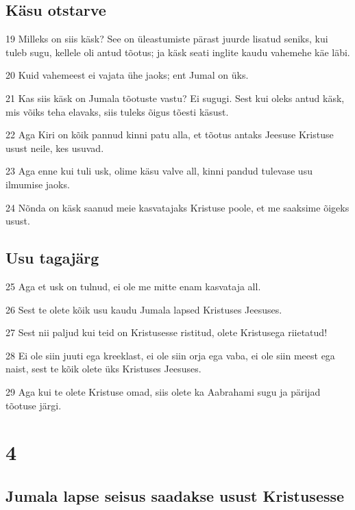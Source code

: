\section*{Käsu otstarve}

\par 19 Milleks on siis käsk? See on üleastumiste pärast juurde lisatud seniks, kui tuleb sugu, kellele oli antud tõotus; ja käsk seati inglite kaudu vahemehe käe läbi.
\par 20 Kuid vahemeest ei vajata ühe jaoks; ent Jumal on üks.
\par 21 Kas siis käsk on Jumala tõotuste vastu? Ei sugugi. Sest kui oleks antud käsk, mis võiks teha elavaks, siis tuleks õigus tõesti käsust.
\par 22 Aga Kiri on kõik pannud kinni patu alla, et tõotus antaks Jeesuse Kristuse usust neile, kes usuvad.
\par 23 Aga enne kui tuli usk, olime käsu valve all, kinni pandud tulevase usu ilmumise jaoks.
\par 24 Nõnda on käsk saanud meie kasvatajaks Kristuse poole, et me saaksime õigeks usust.

\section*{Usu tagajärg}

\par 25 Aga et usk on tulnud, ei ole me mitte enam kasvataja all.
\par 26 Sest te olete kõik usu kaudu Jumala lapsed Kristuses Jeesuses.
\par 27 Sest nii paljud kui teid on Kristusesse ristitud, olete Kristusega riietatud!
\par 28 Ei ole siin juuti ega kreeklast, ei ole siin orja ega vaba, ei ole siin meest ega naist, sest te kõik olete üks Kristuses Jeesuses.
\par 29 Aga kui te olete Kristuse omad, siis olete ka Aabrahami sugu ja pärijad tõotuse järgi.


\chapter{4}

\section*{Jumala lapse seisus saadakse usust Kristusesse}

